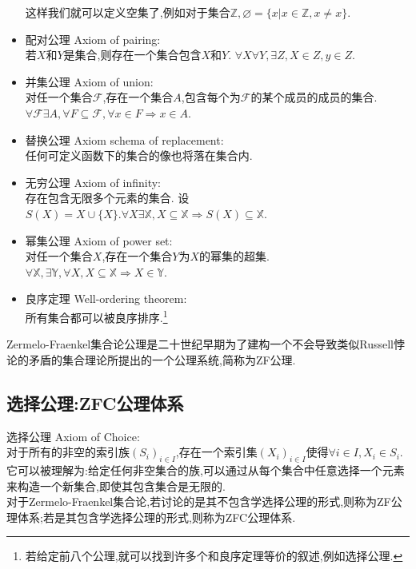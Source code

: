 \documentclass[12pt, a4paper, oneside]{ctexbook}
\begin{document}
\begin{itemize}
      这样我们就可以定义空集了,例如对于集合$\mathbb{Z},\varnothing =\{x|x\in\mathbb{Z}, x\neq x\}$.
    \item 配对公理 Axiom of pairing:\\
      若$X$和$Y$是集合,则存在一个集合包含$X$和$Y$. 
      $\forall X\forall Y, \exists Z,X\in Z,y\in Z $.
    \item 并集公理 Axiom of union:\\
      对任一个集合$\mathcal{F}$,存在一个集合$A$,包含每个为$\mathcal{F}$的某个成员的成员的集合.
      $\forall \mathcal{F}\exists A,\forall F\subseteq\mathcal{F},\forall x\in F\Rightarrow x\in A $.
    \item 替换公理 Axiom schema of replacement:\\
      任何可定义函数下的集合的像也将落在集合内.
    \item 无穷公理 Axiom of infinity:\\
      存在包含无限多个元素的集合.
      设$S(X)=X\cup \{X\}.\forall X \exists \mathbb{X}, X\subseteq \mathbb{X}\Rightarrow S(X)\subseteq \mathbb{X}$.
    \item 幂集公理 Axiom of power set:\\
      对任一个集合$X$,存在一个集合$Y$为$X$的幂集的超集.
      $\forall \mathbb{X},\exists \mathbb{Y},\forall X, X\subseteq \mathbb{X}\Rightarrow X\in\mathbb{Y}$.
    \item 良序定理 Well-ordering theorem:\\
      所有集合都可以被良序排序.\footnote{若给定前八个公理,就可以找到许多个和良序定理等价的叙述,例如选择公理.}
  \end{itemize}

  Zermelo-Fraenkel集合论公理是二十世纪早期为了建构一个不会导致类似Russell悖论的矛盾的集合理论所提出的一个公理系统,简称为ZF公理.
  
  \subsection{选择公理:ZFC公理体系}
  \noindent
  选择公理 Axiom of Choice:\\
  对于所有的非空的索引族$(S_i)_{i\in I}$,存在一个索引集$(X_i)_{i\in I}$使得$\forall i\in I,X_i\in S_i $.
  它可以被理解为:给定任何非空集合的族,可以通过从每个集合中任意选择一个元素来构造一个新集合,即使其包含集合是无限的.\\

  对于Zermelo-Fraenkel集合论,若讨论的是其不包含学选择公理的形式,则称为ZF公理体系;若是其包含学选择公理的形式,则称为ZFC公理体系.
  
\end{document}
